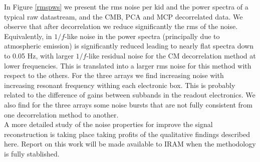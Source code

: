 In Figure \ref{rmspws} we present the rms noise per kid and the power spectra of
a typical raw datastream, and the CMB, PCA and MCP decorrelated data.  We observe that after
decorrelation we reduce significantly the rms of the noise. Equivalently, in
$1/f$-like noise in the power spectra (principally due to atmospheric emission)
is significantly reduced leading to nearly flat spectra down to 0.05 Hz, with
larger $1/f$-like residual noise for the CM decorrelation method at lower
frequencies. This is translated into a larger rms noise for this method with
respect to the others. For the three arrays we find increasing noise with
increasing resonant frequency withing each electronic box. This is probably
related to the difference of gains between subbands in the readout
electronics. We also find for the three arrays some noise bursts that are not
fully consistent from one decorrelation method to another. \\

A more detailed study of the noise properties for improve the signal reconstruction is taking place taking profits of the qualitative findings described here. Report on this work will be made available to IRAM when the methodology is fully stablished.
